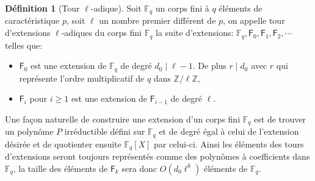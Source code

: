 \documentclass[10pt,a4paper]{book}
\theoremstyle{plain}
\theoremstyle{definition}
\theoremstyle{definition}
\theoremstyle{definition}
\theoremstyle{definition}
\newtheorem{defi}[thm]{Définition}
\theoremstyle{remark}
\theoremstyle{remark}
\begin{document}
\begin{defi}[Tour \textit{$\ell$}-adique]
\label{def:tour-ell}
Soit $\mathbb{F}_q$ un corps fini à $q$ éléments de caractéristique $p$, soit $\ell$ un nombre premier différent de $p$, on appelle tour d'extensions $\ell$-adiques du corps fini $\mathbb{F}_q$ la suite d'extensions: $\mathbb{F}_q, \mathsf{F}_{0}, \mathsf{F}_{1}, \mathsf{F}_{2}, \cdots$ telles que:
\begin{itemize}
\item $\mathsf{F}_{0}$ est une extension de $\mathbb{F}_q$ de degré $d_0 \mid \ell-1$. De plus $r \mid d_0$ avec $r$ qui représente l'ordre multiplicatif de $q$ dans $\mathbb{Z}/\ell \mathbb{Z}$,
\item $\mathsf{F}_{i}$ pour $i \geqslant 1$ est une extension de $\mathsf{F}_{i-1}$ de degré $\ell$.
\end{itemize}
\end{defi}

Une façon naturelle de  construire une extension d'un corps fini $\mathbb{F}_q$ est de trouver un polynôme $P$ irréductible défini sur $\mathbb{F}_q$ et de degré égal à celui de l'extension désirée et de quotienter ensuite $\mathbb{F}_q[X]$ par celui-ci.
Ainsi les éléments des tours d'extensions seront toujours représentés comme des polynômes à coefficients dans $\mathbb{F}_q$, la taille des éléments de $\mathsf{F}_{k}$ sera donc $O(d_0\ell^k)$ éléments de $\mathbb{F}_q$. 
\end{document}
